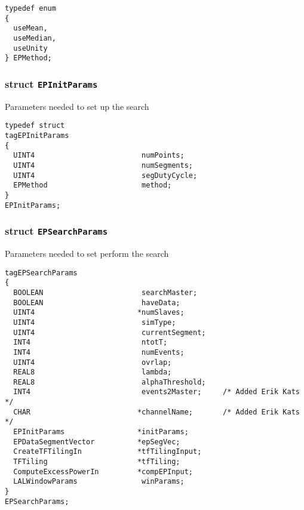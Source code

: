 \begin{verbatim}
typedef enum
{
  useMean,
  useMedian,
  useUnity
} EPMethod;

\end{verbatim}

\subsubsection*{struct \texttt{EPInitParams}}

\noindent Parameters needed to set up the search

\begin{verbatim}
typedef struct
tagEPInitParams
{
  UINT4                         numPoints;
  UINT4                         numSegments;
  UINT4                         segDutyCycle;
  EPMethod                      method;
}
EPInitParams;
\end{verbatim}


\subsubsection*{struct \texttt{EPSearchParams}}

\noindent Parameters needed to set perform the search

\begin{verbatim}
tagEPSearchParams
{
  BOOLEAN                       searchMaster;
  BOOLEAN                       haveData;
  UINT4                        *numSlaves;          
  UINT4                         simType;
  UINT4                         currentSegment;
  INT4                          ntotT;
  INT4                          numEvents;
  UINT4                         ovrlap;
  REAL8                         lambda;
  REAL8                         alphaThreshold;
  INT4                          events2Master;     /* Added Erik Kats */
  CHAR                         *channelName;       /* Added Erik Kats */
  EPInitParams                 *initParams;
  EPDataSegmentVector          *epSegVec;
  CreateTFTilingIn             *tfTilingInput;
  TFTiling                     *tfTiling;
  ComputeExcessPowerIn         *compEPInput;
  LALWindowParams               winParams;
}
EPSearchParams;
\end{verbatim}






